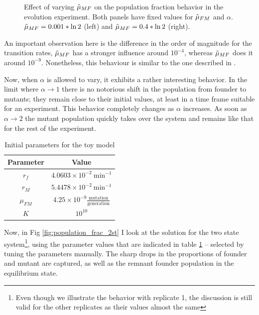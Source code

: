 \documentclass[10pt,a4paper]{scrartcl}
\begin{document}
\begin{figure}
\begin{subfigure}[b]{0.4\textwidth}
    \end{subfigure}
    \caption{Effect of varying $\Tilde{\mu}_{MF}$ on the population fraction behavior in the evolution experiment. Both panels have fixed values for $\Tilde{\mu}_{FM}$ and $\alpha$. $\Tilde{\mu}_{MF} = 0.001 * \ln{2}$ (left) and $\Tilde{\mu}_{MF} = 0.4 * \ln{2}$ (right). }
    \label{fig:effect_of_varying_mu_mf}
\end{figure}

An important observation here is the difference in the order of magnitude for the transition rates,   $\Tilde{\mu}_{MF}$ has a stronger influence around $10^{-4}$, whereas $\Tilde{\mu}_{MF}$ does it around $10^{-9}$. Nonetheless, this behaviour is similar to the one described in \cite{reams_duplication_2010}.

Now, when $\alpha$ is allowed to vary, it exhibits a rather interesting behavior. In the limit where $\alpha \rightarrow 1$ there is no notorious shift in the population from founder to mutants; they remain close to their initial values, at least in a time frame suitable for an experiment. This behavior completely changes as $\alpha$ increases. As soon as $\alpha  \rightarrow 2$ the mutant population quickly takes over the system and remains like that for the rest of the experiment.


\begin{table}[H]
    \centering
    \begin{tabular}{|c|c|}
        \hline
        Parameter & Value\\
         \hline
         $r_f$& $4.0603\times 10^{-2} \ \text{min}^{-1}$\\
         $r_M$& $5.4478\times 10^{-2} \ \text{min}^{-1}$\\
         $\mu_{FM}$ & $4.25\times 10^{-9}\frac{\text{mutation}}{\text{generation}}$\\
         $K$ & $10^{10}$\\
         \hline
    \end{tabular}
    \caption{Initial parameters for the toy model}
    \label{tab:initial_parameters_two_state_model}
\end{table}


Now,  in Fig \ref{fig:population_frac_2st} I look at the solution for the two state system\footnote{Even though we illustrate the behavior with replicate 1, the discussion is still valid for the other replicates as their values almost the same}, using the parameter values that are indicated in table \ref{tab:initial_parameters_two_state_model} -- selected by tuning the parameters manually. %
The sharp drops in the proportions of founder and mutant are captured, as well as the remnant founder population in the equilibrium state.
\end{document}
